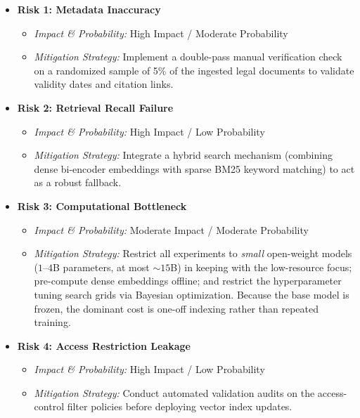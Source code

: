 \begin{itemize}[leftmargin=*]
    \item \textbf{Risk 1: Metadata Inaccuracy}
    \begin{itemize}
        \item \textit{Impact \& Probability:} High Impact / Moderate Probability
        \item \textit{Mitigation Strategy:} Implement a double-pass manual verification check on a randomized sample of 5\% of the ingested legal documents to validate validity dates and citation links.
    \end{itemize}
    \item \textbf{Risk 2: Retrieval Recall Failure}
    \begin{itemize}
        \item \textit{Impact \& Probability:} High Impact / Low Probability
        \item \textit{Mitigation Strategy:} Integrate a hybrid search mechanism (combining dense bi-encoder embeddings with sparse BM25 keyword matching) to act as a robust fallback.
    \end{itemize}
    \item \textbf{Risk 3: Computational Bottleneck}
    \begin{itemize}
        \item \textit{Impact \& Probability:} Moderate Impact / Moderate Probability
        \item \textit{Mitigation Strategy:} Restrict all experiments to \emph{small} open-weight models ($1$--$4$B parameters, at most ${\sim}15$B) in keeping with the low-resource focus; pre-compute dense embeddings offline; and restrict the hyperparameter tuning search grids via Bayesian optimization. Because the base model is frozen, the dominant cost is one-off indexing rather than repeated training.
    \end{itemize}
    \item \textbf{Risk 4: Access Restriction Leakage}
    \begin{itemize}
        \item \textit{Impact \& Probability:} High Impact / Low Probability
        \item \textit{Mitigation Strategy:} Conduct automated validation audits on the access-control filter policies before deploying vector index updates.
    \end{itemize}
\end{itemize}
